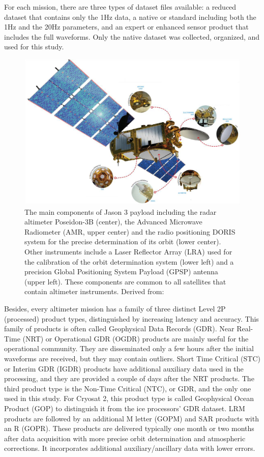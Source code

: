 For each mission, there are three types of dataset files available: a reduced dataset that contains only the 1Hz data, a native or standard including both the 1Hz and the 20Hz parameters, and an expert or enhanced sensor product that includes the full waveforms. Only the native dataset was collected, organized, and used for this study. 


\begin{figure}[H]
\centering
\includegraphics[width=0.95\linewidth]{Figures/Chapter4/jason3_payload.png}
\caption{The main components of Jason 3 payload including the radar altimeter Poseidon-3B (center), the Advanced Microwave Radiometer (AMR, upper center) and the radio positioning DORIS system for the precise determination of its orbit (lower center). Other instruments include a Laser Reflector Array (LRA) used for the calibration of the orbit determination system (lower left) and a precision Global Positioning System Payload (GPSP) antenna (upper left). These components are common to all satellites that contain altimeter instruments. Derived from: \cite{Jason32018}}
\label{fig:jason3_payload}
\end{figure}



Besides, every altimeter mission has a family of three distinct Level 2P (processed) product types, distinguished by increasing latency and accuracy. This family of products is often called Geophysical Data Records (GDR). Near Real-Time (NRT) or Operational GDR (OGDR) products are mainly useful for the operational community. They are disseminated only a few hours after the initial waveforms are received, but they may contain outliers. Short Time Critical (STC) or Interim GDR (IGDR) products have additional auxiliary data used in the processing, and they are provided a couple of days after the NRT products. The third product type is the Non-Time Critical (NTC), or GDR, and the only one used in this study. For Cryosat 2, this product type is called Geophysical Ocean Product (GOP) to distinguish it from the ice processors’ GDR dataset. LRM products are followed by an additional M letter (GOPM) and SAR products with an R (GOPR). These products are delivered typically one month or two months after data acquisition with more precise orbit determination and atmospheric corrections. It incorporates additional auxiliary/ancillary data with lower errors.

